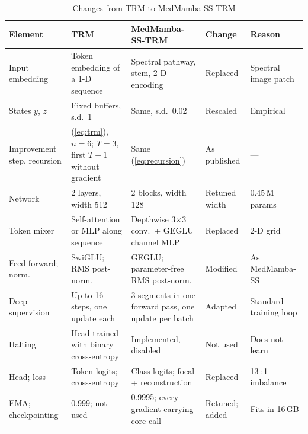 \documentclass{svproc}
\begin{document}
\begin{table}[!htb]
\caption{Changes from TRM to MedMamba-SS-TRM}
\label{tab:chg-tiny}
\centering\scriptsize
\setlength{\tabcolsep}{3pt}
\begin{tabular}{@{}L{1.9cm}L{2.9cm}L{3.1cm}L{1.5cm}L{1.9cm}@{}}
\toprule
Element & TRM~\cite{trm} & MedMamba-SS-TRM & Change & Reason \\
\midrule
Input embedding & Token embedding of a 1-D sequence & Spectral pathway, stem, 2-D encoding & Replaced & Spectral image patch \\
States $y$, $z$ & Fixed buffers, s.d.\ 1 & Same, s.d.\ 0.02 & Rescaled & Empirical \\
Improvement step, recursion & (\ref{eq:trm}), $n = 6$; $T = 3$, first $T{-}1$ without gradient & Same (\ref{eq:recursion}) & As published & --- \\
Network & 2 layers, width 512 & 2 blocks, width 128 & Retuned width & 0.45\,M params \\
Token mixer & Self-attention or MLP along sequence & Depthwise 3$\times$3 conv.\ + GEGLU channel MLP & Replaced & 2-D grid \\
Feed-forward; norm. & SwiGLU; RMS post-norm. & GEGLU; parameter-free RMS post-norm. & Modified & As MedMamba-SS \\
Deep supervision & Up to 16 steps, one update each & 3 segments in one forward pass, one update per batch & Adapted & Standard training loop \\
Halting & Head trained with binary cross-entropy & Implemented, disabled & Not used & Does not learn \\
Head; loss & Token logits; cross-entropy & Class logits; focal + reconstruction & Replaced & 13\,:\,1 imbalance \\
EMA; checkpointing & 0.999; not used & 0.9995; every gradient-carrying core call & Retuned; added & Fits in 16\,GB \\
\bottomrule
\end{tabular}
\end{table}
\end{document}
